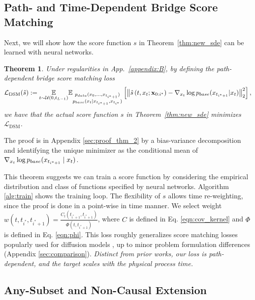 \documentclass{article}
\newcommand{\pdata}{p_{\normalfont{data}}}
\newcommand{\pbase}{p_{\normalfont{base}}}
\newtheorem{theorem}{Theorem}
\begin{document}
\subsection{Path- and Time-Dependent Bridge Score Matching}

Next, we will show how the score function $s$ in Theorem~\ref{thm:new_sde} can be learned with neural networks.

\begin{theorem}
    \label{thm:path_dependent_score}
    Under regularities in App.~\ref{appendix:B},
    by defining the path-dependent bridge score matching loss
    \begin{align}
        \mathcal{L}_{\text{DSM}}(\hat{s}) := \displaystyle \underset{t \sim \mathcal{U}(0, t_{L-1})}{\mathbb{E}} \mathbb{E}_{\substack{\pdata(x_0, \ldots, x_{t_{i^* + 1}}) \\ \pbase(x_t | x_{t_{i^* + 1}}, x_{t_{i^*}})}} \left[\left\|
        \hat{s}\left(t,x_t; \mathbf{x}_{0:i^*}\right) - \nabla_{x_t} \log \pbase(x_{t_{i^* + 1}} | x_t)\right\|_2^2\right]\label{eqn:simplified_dsm_main},
    \end{align}
    we have that the actual score function $s$ in Theorem~\ref{thm:new_sde} minimizes $\mathcal{L}_{\text{DSM}}$.
\end{theorem}
The proof is in Appendix \ref{sec:proof_thm_2} by a bias-variance decomposition and identifying the unique minimizer as the conditional mean of $\nabla_{x_t}\log\pbase(x_{t_{i^*+1}}\mid x_t)$.

This theorem suggests we can train a score function by considering the empirical distribution and class of functions specified by neural networks. Algorithm \ref{alg:train} shows the training loop. The flexibility of $s$ allows time re-weighting, since the proof is done in a point-wise in time manner. We select weight $w(t, t_{i^*}, t_{i^*+1}) = \frac{C_t(t_{i^*+1}, t_{i^*+1})}{\Phi(t, t_{i^*+1})}$, where $C$ is defined in Eq. \ref{eqn:cov_kernel} and $\Phi$ is defined in Eq. \ref{eqn:phi}.
This loss roughly generalizes score matching losses popularly used for diffusion models \cite{song2020score, zhou2023denoising}, up to minor problem formulation differences (Appendix \ref{sec:comparison}). \textit{Distinct from prior works, our loss is path-dependent, and the target scales with the physical process time.}

\subsection{Any-Subset and Non-Causal Extension}\label{subsec:any_subset}
\end{document}
